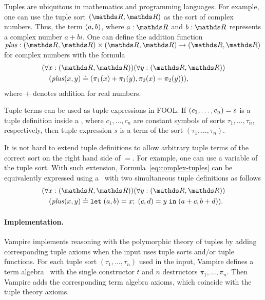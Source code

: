 Tuples are ubiquitous in mathematics and programming languages. For example, one can use the tuple sort $(\R,\R)$ as the sort of complex numbers. Thus, the term $({a,b})$, where $a:\R$ and $b:\R$ represents a complex number $a+bi$. One can define the addition function $\mathit{plus}: (\R,\R) \times (\R,\R) \to (\R,\R)$ for complex numbers with the formula
\begin{equation}\label{eq:complex-tuples}
  \begin{aligned}
    &(\forall x:(\R,\R))(\forall y:(\R,\R)) \\
    &\quad(\mathit{plus}(x,y)\eql \tuple{\pi_1(x) + \pi_1(y), \pi_2(x) + \pi_2(y)}),
  \end{aligned}
\end{equation} where $+$ denotes addition for real numbers.

Tuple terms can be used as tuple expressions in FOOL. If ${(c_1,\ldots,c_n)}={s}$ is a tuple definition inside a \LETIN, where $c_1,\ldots,c_n$ are constant symbols of sorts $\tau_1,\ldots,\tau_n$, respectively, then tuple expression $s$ is a term of the sort $(\tau_1,\ldots,\tau_n)$.

It is not hard to extend tuple definitions to allow arbitrary tuple terms of the correct sort on the right hand side of $=$. For example, one can use a variable of the tuple sort. With such extension, Formula~\ref{eq:complex-tuples} can be equivalently expressed using a \LETIN\ with two simultaneous tuple definitions as follows
\begin{equation}\label{eq:complex-tuples2}
  \begin{aligned}
    &(\forall x:(\R,\R))(\forall y:(\R,\R))\\
    &\quad(\mathit{plus}(x,y)\eql \letinpar{(a,b)}{x}{(c,d)}{y}{\tuple{a+c,b+d}).}
  \end{aligned}
\end{equation}

\paragraph*{\bf Implementation.}
Vampire implements reasoning with the polymorphic theory of tuples by adding corresponding tuple axioms when the input uses tuple sorts and/or tuple functions. For each tuple sort $(\tau_1,\ldots,\tau_n)$ used in the input, Vampire defines a term algebra~\cite{DBLP:conf/popl/KovacsRV17} with the single constructor $t$ and $n$ destructors $\pi_1,\ldots,\pi_n$. Then Vampire adds the corresponding term algebra axioms, which coincide with the tuple theory axioms.

